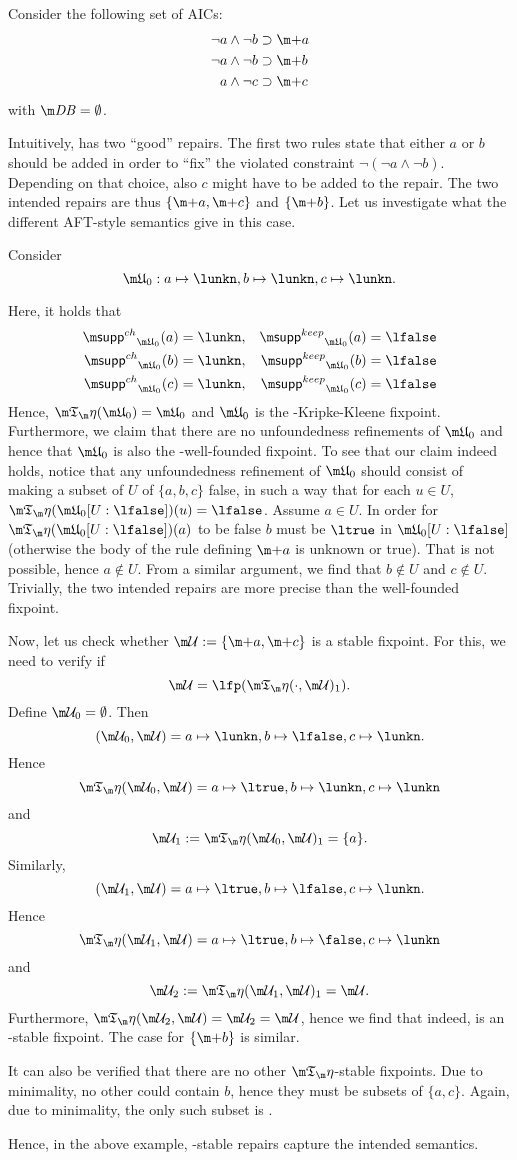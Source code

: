 \begin{example}
 Consider the following set \aics of AICs:
\begin{align*}
 \lnot a \land \lnot b&\aicrule \add a\\
 \lnot a \land \lnot b&\aicrule \add b\\
 a \land \lnot c &\aicrule \add c 
 \end{align*} with $\db = \emptyset$.
 
 Intuitively, \aics has two ``good'' repairs. The first two rules state that either $a$ or $b$ should be added in order to ``fix'' the violated constraint $\lnot (\lnot a \land \lnot b)$. 
 Depending on that choice, also $c$ might have to be added to the repair. The two intended repairs are thus $\{\add a,\add c\}$ and $\{\add b\}$. 
 Let us investigate what the different AFT-style semantics give in this case. 
 
 Consider 
\[\UUU_0: a\mapsto \lunkn, b\mapsto \lunkn, c\mapsto\lunkn.\]

Here, it holds that 
\begin{align*}
 \suppin_{\UUU_0}(a) &= \lunkn, & \suppout_{\UUU_0}(a) &=\lfalse \\
 \suppin_{\UUU_0}(b) &= \lunkn, & \suppout_{\UUU_0}(b) &=\lfalse \\
 \suppin_{\UUU_0}(c) &= \lunkn, & \suppout_{\UUU_0}(c) &=\lfalse 
\end{align*}
Hence, $\Ap(\UUU_0) = \UUU_0$ and $\UUU_0$ is the \Ap-Kripke-Kleene fixpoint. 
Furthermore, we claim that there are no unfoundedness refinements of $\UUU_0$ and hence that $\UUU_0$ is also the \Ap-well-founded fixpoint. To see that our claim indeed holds, notice that any unfoundedness refinement of $\UUU_0$ should consist of making a subset of $U$ of $\{a,b,c\}$ false, in such a way that for each $u\in U$, $\Ap(\UUU_0[U: \lfalse])(u)=\lfalse$. 
Assume $a\in U$. In order for $\Ap(\UUU_0[U: \lfalse])(a)$ to be false $b$ must be $\ltrue$ in $\UUU_0[U: \lfalse]$ (otherwise the body of the rule defining $\add a$ is unknown or true). That is not possible, hence $a\not \in U$. From a similar argument, we find that $b\not \in U$ and $c\not \in U$. 
Trivially, the two intended repairs are more precise than the well-founded fixpoint. 

Now, let us check whether $\UU := \{\add a, \add c\}$ is a stable fixpoint. 
For this, we need to verify if 
\[\UU =\lfp(\Ap(\cdot,\UU)_1).\]
Define $\UU_0=\emptyset$. Then 
\[(\UU_0,\UU) = a \mapsto \lunkn, b\mapsto \lfalse, c\mapsto \lunkn.\]
Hence 
\[\Ap(\UU_0,\UU) = a \mapsto \ltrue, b\mapsto \lunkn, c \mapsto \lunkn\]
and 
\[\UU_1 := \Ap(\UU_0,\UU)_1 = \{a\}.\]
Similarly, 
\[(\UU_1,\UU) = a \mapsto \ltrue, b\mapsto \lfalse, c\mapsto \lunkn.\]
Hence 
\[\Ap(\UU_1,\UU) = a \mapsto \ltrue, b\mapsto \false, c \mapsto \lunkn\]
and 
\[\UU_2 := \Ap(\UU_1,\UU)_1 = \UU.\]
Furthermore, $\Ap(\UU_2,\UU) = \UU_2=\UU$, hence  we find that indeed, \UU is an \Ap-stable fixpoint. 
The case for $\{\add b\}$ is similar. 

It can also be verified that there are no other $\Ap$-stable fixpoints. Due to minimality, no other could contain $b$, hence they must be subsets of $\{a,c\}$. Again, due to minimality, the only such subset is \UU. 

\end{example}
Hence, in the above example, \Ap-stable repairs capture the intended semantics. 
